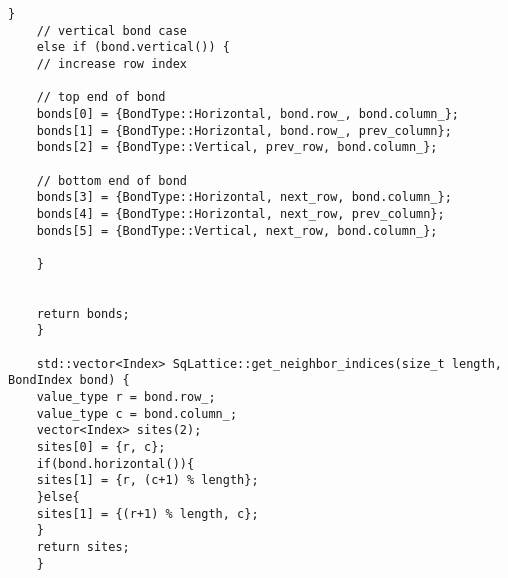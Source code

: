\begin{lstlisting}[style=CStyle]
	}
	// vertical bond case
	else if (bond.vertical()) {
	// increase row index
	
	// top end of bond
	bonds[0] = {BondType::Horizontal, bond.row_, bond.column_};
	bonds[1] = {BondType::Horizontal, bond.row_, prev_column};
	bonds[2] = {BondType::Vertical, prev_row, bond.column_};
	
	// bottom end of bond
	bonds[3] = {BondType::Horizontal, next_row, bond.column_};
	bonds[4] = {BondType::Horizontal, next_row, prev_column};
	bonds[5] = {BondType::Vertical, next_row, bond.column_};
	
	}
	
	
	return bonds;
	}
	
	std::vector<Index> SqLattice::get_neighbor_indices(size_t length, BondIndex bond) {
	value_type r = bond.row_;
	value_type c = bond.column_;
	vector<Index> sites(2);
	sites[0] = {r, c};
	if(bond.horizontal()){
	sites[1] = {r, (c+1) % length};
	}else{
	sites[1] = {(r+1) % length, c};
	}
	return sites;
	}
	
	\end{lstlisting}
	
